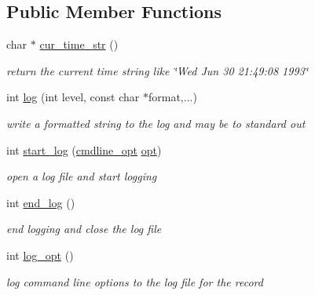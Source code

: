 \subsection*{Public Member Functions}
\begin{DoxyCompactItemize}
\item 
\mbox{\label{structlogger_afa0e701e9585188b9efa9b547f1120a4}} 
char $\ast$ \hyperlink{structlogger_afa0e701e9585188b9efa9b547f1120a4}{cur\+\_\+time\+\_\+str} ()
\begin{DoxyCompactList}\small\item\em return the current time string like \char`\"{}\+Wed Jun 30 21\+:49\+:08 1993\char`\"{} \end{DoxyCompactList}\item 
int \hyperlink{structlogger_aa079e325d6f0279f803843acc2a8c6f5}{log} (int level, const char $\ast$format,...)
\begin{DoxyCompactList}\small\item\em write a formatted string to the log and may be to standard out \end{DoxyCompactList}\item 
int \hyperlink{structlogger_a2d852f1f257849e0abed587814446908}{start\+\_\+log} (\hyperlink{structcmdline__opt}{cmdline\+\_\+opt} \hyperlink{structlogger_a0e07e1e52c554084e6c3c06476024b9a}{opt})
\begin{DoxyCompactList}\small\item\em open a log file and start logging \end{DoxyCompactList}\item 
\mbox{\label{structlogger_ae79e87e0de219c9e001417f5b220c325}} 
int \hyperlink{structlogger_ae79e87e0de219c9e001417f5b220c325}{end\+\_\+log} ()
\begin{DoxyCompactList}\small\item\em end logging and close the log file \end{DoxyCompactList}\item 
\mbox{\label{structlogger_ac47293937a4c2f844bddf3cc781fab1e}} 
int \hyperlink{structlogger_ac47293937a4c2f844bddf3cc781fab1e}{log\+\_\+opt} ()
\begin{DoxyCompactList}\small\item\em log command line options to the log file for the record \end{DoxyCompactList}\item 

\end{DoxyCompactItemize}
